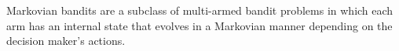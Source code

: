 Markovian bandits are a subclass of multi-armed bandit problems in which each arm has an internal state that evolves in a Markovian manner depending on the decision maker's actions. 
